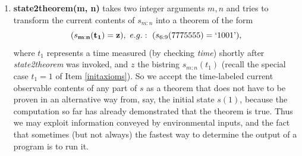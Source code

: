 \begin{enumerate}
The purpose of introducing $t_1$ is to deal with hardware-specific
temporal delays that may be involved in checking and switching---it may
take a significant amount of
time to match abstract symbol strings found during proof search to the
\gmn's real current state.
If a target theorem has been found, {\em check()} uses a
simple prewired subroutine (also encoded in $p(1)$, of course)
to check whether there is enough time left
to set variable {\em switchbit} (originally 0) to 1 before
the continually increasing $time$ will equal $t_1$.
If this subroutine
returns a negative result, {\em check()} exits.
Otherwise it sets {\em switchbit} $:=1$
(there is no other way of changing {\em switchbit}).
Then it repeatedly tests $time$ until $time > t_1$, to make sure
the condition of formula (\ref{goal})
was fulfilled at $t_1$.
Then it transfers control to {\em switchprog}
(there is no other way of calling {\em switchprog}).
The {\em switchprog}
may subsequently rewrite all parts of $s$, excluding hardware-reserved
parts such as $time$ and $x$, but including $p$.

\item 
\label{state2theorem} 
{\bf state2theorem(m, n)}
takes two integer arguments $m, n$
and tries to transform the current contents of $s_{m:n}$ 
into a theorem of the form 
\[
(s_{{\bf m}:{\bf n}}({\bf t_1})={\bf z}),
~e.g.:~ (s_{6:9}(7775555)=`1001\textrm{'}),
\]
where $t_1$ represents a time measured (by checking {\em time})
shortly after {\em state2theorem} was invoked, 
and $z$ the bistring $s_{m:n}(t_1)$ (recall the special 
case $t_1=1$ of Item \ref{initaxioms}).
So we accept the time-labeled current 
observable contents of any part of $s$ as a theorem that does not have
to be proven in an alternative way from, say, the 
initial state $s(1)$, because the computation so far
has already demonstrated that the theorem is true.
Thus we may exploit information conveyed
by environmental inputs, and the fact that sometimes
(but not always) the fastest way
to determine the output of a program is to run it.


\end{enumerate}
